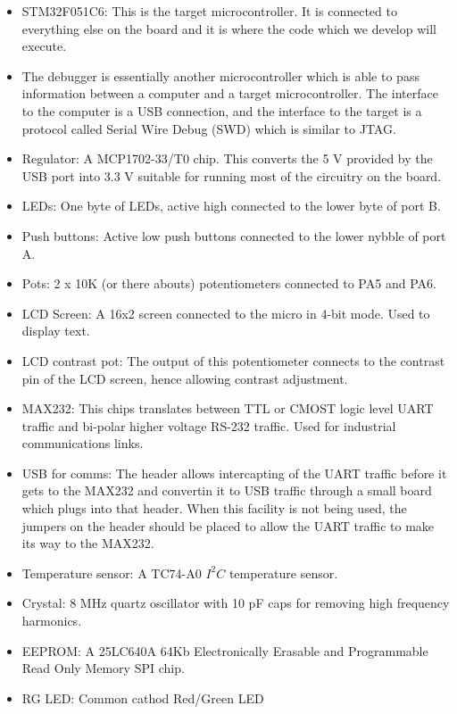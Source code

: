 \begin{itemize}
  \item STM32F051C6: This is the target microcontroller. It is connected to everything else on the board and it is where the code which we develop will execute. 
  \item The debugger is essentially another microcontroller which is able to pass information between a computer and a target microcontroller. The interface to the computer is a USB connection, and the interface to the target is a protocol called Serial Wire Debug (SWD) which is similar to JTAG. 
  \item Regulator: A MCP1702-33/T0 chip. This converts the 5 V provided by the USB port into 3.3 V suitable for running most of the circuitry on the board. 
  \item LEDs: One byte of LEDs, active high connected to the lower byte of port B.
  \item Push buttons: Active low push buttons connected to the lower nybble of port A.
  \item Pots: 2 x 10K (or there abouts) potentiometers connected to PA5 and PA6.
  \item LCD Screen: A 16x2 screen connected to the micro in 4-bit mode. Used to display text.
  \item LCD contrast pot: The output of this potentiometer connects to the contrast pin of the LCD screen, hence allowing contrast adjustment.
  \item MAX232: This chips translates between TTL or CMOST logic level UART traffic and bi-polar higher voltage RS-232 traffic. Used for industrial communications links.
  \item USB for comms: The header allows intercapting of the UART traffic before it gets to the MAX232 and convertin it to USB traffic through a small board which plugs into that header. When this facility is not being used, the jumpers on the header should be placed to allow the UART traffic to make its way to the MAX232.
  \item Temperature sensor: A TC74-A0 $I^2C$ temperature sensor.
  \item Crystal: 8 MHz quartz oscillator with 10 pF caps for removing high frequency harmonics. 
  \item EEPROM: A 25LC640A 64Kb Electronically Erasable and Programmable Read Only Memory SPI chip.
  \item RG LED: Common cathod Red/Green LED
\end{itemize}

